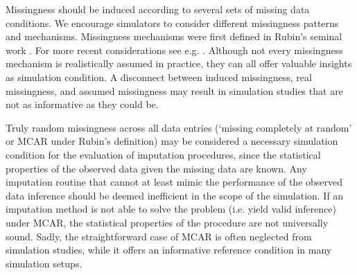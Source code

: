 \documentclass[bimj,fleqn]{w-art}
\begin{document}

Missingness should be induced according to several sets of missing data conditions. We encourage simulators to consider different missingness patterns and mechanisms. Missingness mechanisms were first defined in Rubin's seminal work \citep{rubi76}. For more recent considerations see e.g. \citet{seam13, meal15, dore18, more18, scho18, litt20, moha21, scho21}. Although not every missingness mechanism is realistically assumed in practice, they can all offer valuable insights as simulation condition. A disconnect between induced missingness, real missingness, and assumed missingness may result in simulation studies that are not as informative as they could be.

Truly random missingness across all data entries (`missing completely at random' or MCAR under Rubin's definition) may be considered a necessary simulation condition for the evaluation of imputation procedures, since the statistical properties of the observed data given the missing data are known. Any imputation routine that cannot at least mimic the performance of the observed data inference should be deemed inefficient in the scope of the simulation. If an imputation method is not able to solve the problem (i.e. yield valid inference) under MCAR, the statistical properties of the procedure are not universally sound. Sadly, the straightforward case of MCAR is often neglected from simulation studies, while it offers an informative reference condition in many simulation setups.
\end{document}
